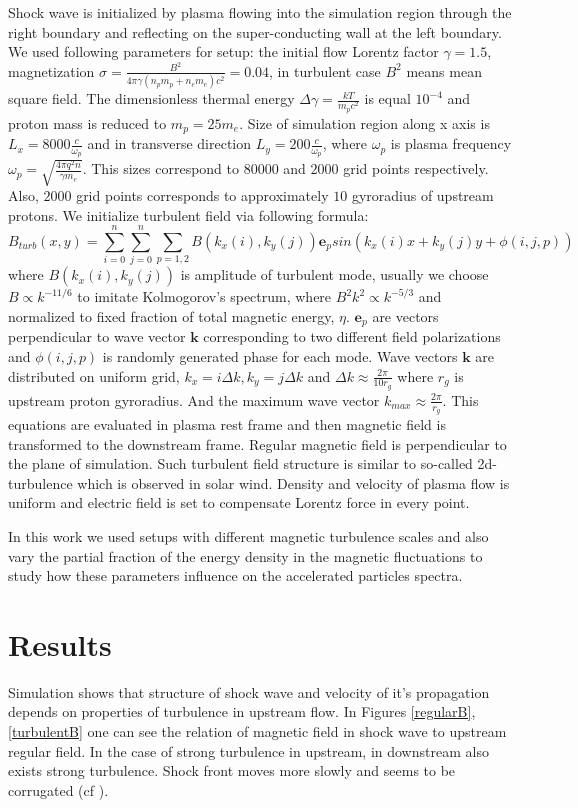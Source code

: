 \documentclass[a4paper]{jpconf}
\begin{document}
Shock wave is initialized by plasma flowing into the simulation region through the right boundary and reflecting on the super-conducting wall at the left boundary. We used following parameters for setup: the initial flow Lorentz factor $\gamma = 1.5$, magnetization $\sigma = \frac{B^2}{4\pi\gamma (n_p m_p + n_e m_e) c^2} = 0.04$, in turbulent case $B^2$ means mean square field. The dimensionless thermal energy $\Delta \gamma = \frac{k T}{m_p c^2}$ is equal $10^{-4}$ and proton mass is reduced to $m_p = 25 m_e$. Size of simulation region along x axis is $L_x = 8000\frac{c}{\omega_p}$ and in transverse direction $L_y = 200\frac{c}{\omega_p}$, where $\omega_p$ is plasma frequency $\omega_p = \sqrt{\frac{4\pi q^2 n}{\gamma m_e}}$. This sizes correspond to $80000$ and $2000$ grid points respectively. Also, $2000$ grid points corresponds to approximately $10$ gyroradius of upstream protons.
We initialize turbulent field via following formula: 
\begin{equation}
B_{turb} (x,y) = \sum_{i=0}^{n}\sum_{j=0}^{n}\sum_{p=1,2}B(k_x(i),k_y(j)) \textbf{e}_{p} sin(k_x(i) x + k_y(j) y  + \phi (i,j,p))
\end{equation}
where $B(k_x(i),k_y(j))$ is amplitude of turbulent mode, usually we choose $B \propto k^{-11/6}$ to imitate Kolmogorov's spectrum, where $B^2 k^2 \propto k^{-5/3}$ and normalized to fixed fraction of total magnetic energy, $\eta$. $\textbf{e}_{p}$ are vectors perpendicular to wave vector $\textbf{k}$ corresponding to two different field polarizations and $\phi (i,j,p)$ is randomly generated phase for each mode. Wave vectors $\textbf{k}$ are distributed on uniform grid, $k_x = i \Delta k, k_y = j \Delta k$ and $\Delta k \approx \frac{2 \pi}{10 r_g}$ where $r_g$ is upstream proton gyroradius. And the maximum wave vector $k_{max} \approx \frac{2 \pi}{r_g}$. This equations are evaluated in plasma rest frame and then magnetic field is transformed to the downstream frame. Regular magnetic field is perpendicular to the plane of simulation. Such turbulent field structure is similar to so-called 2d-turbulence which is observed in solar wind\cite{Matthaeus1990}. Density and velocity of plasma flow is uniform and electric field is set to compensate Lorentz force in every point.

In this work we used setups with different magnetic turbulence scales and also vary the partial fraction of the energy density in the magnetic fluctuations to study how these parameters influence on the accelerated particles spectra.

\section{Results}
Simulation shows that structure of shock wave and velocity of it's propagation depends on properties of turbulence in upstream flow. In Figures \ref{regularB}, \ref{turbulentB} one can see the relation of magnetic field in shock wave to upstream regular field. In the case of strong turbulence in upstream, in downstream also exists strong turbulence. Shock front moves more slowly and seems to be corrugated (cf \cite{2016ApJ...827...44L}).
\end{document}
